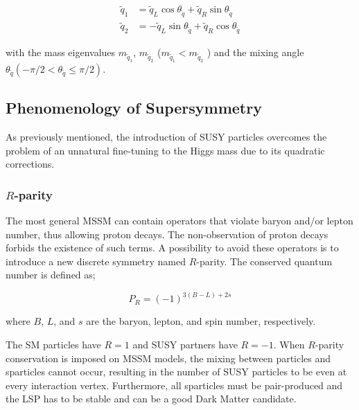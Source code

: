 				\begin{align}
					\tilde{q}_1 & = \tilde{q}_L \cos \theta_{\tilde{q}} + \tilde{q}_R \sin \theta_{\tilde{q}} \\
					\tilde{q}_2 & = - \tilde{q}_L \sin \theta_{\tilde{q}} + \tilde{q}_R \cos \theta_{\tilde{q}}
				\end{align}
				
				\noindent with the mass eigenvalues $m_{\tilde{q}_1}$, $m_{\tilde{q}_2}$ ($m_{\tilde{q}_1} < m_{\tilde{q}_2}$ ) and the mixing angle $\theta_{\tilde{q}} \left (- \pi / 2 < \theta_{\tilde{q}} \leq \pi / 2 \right )$. 
				


		\subsection{Phenomenology of Supersymmetry}
		\label{sec:SUSYPheno}

			As previously mentioned, the introduction of \ac{SUSY} particles overcomes the problem of an unnatural fine-tuning to the Higgs mass due to its quadratic corrections.%

			\subsubsection*{$R$-parity}
				
				The most general \ac{MSSM} can contain operators that violate baryon and/or lepton number, thus allowing proton decays. The non-observation of proton decays forbids the existence of such terms. A possibility to avoid these operators is to introduce a new discrete symmetry named $R$-parity. The conserved quantum number is defined as;

				\begin{equation}
					P_R = \left ( -1 \right )^{3 \left (B - L \right )+ 2s}
				\end{equation}

				\noindent where $B$, $L$, and $s$ are the baryon, lepton, and spin number, respectively.	

				The \ac{SM} particles have $R = 1$ and \ac{SUSY} partners have $R=-1$. When $R$-parity conservation is imposed on \ac{MSSM} models, the mixing between particles and sparticles cannot occur, resulting in the number of \ac{SUSY} particles to be even at every interaction vertex. Furthermore, all sparticles must be pair-produced and the \ac{LSP} has to be stable and can be a good Dark Matter candidate. %

